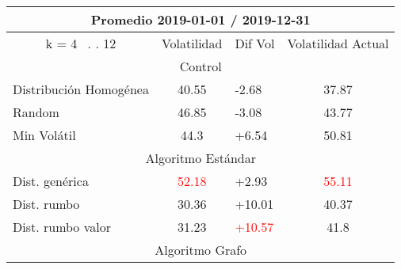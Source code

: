 \documentclass[12pt,a4paper]{article}
\begin{document}
\begin{table}[H]
\centering
\begin{tabular}{l|c|l|c|} 
\hline
\multicolumn{4}{c}{{\cellcolor[rgb]{0.635,0.647,0.788}}Promedio 2019-01-01 / 2019-12-31}                                                                                            \\ 
\hline
\multicolumn{1}{c|}{{\cellcolor[rgb]{0.635,0.647,0.788}}k = 4~ . . 12} & Volatilidad                       & Dif Vol                           & Volatilidad Actual                 \\ 
\hline
\multicolumn{4}{c}{{\cellcolor[rgb]{0.796,0.808,0.984}}Control}                                                                                                                     \\ 
\hline
\rowcolor[rgb]{0.925,0.957,1} Distribución Homogénea                   & 40.55                             & -2.68                             & 37.87                              \\
\rowcolor[rgb]{0.855,0.91,0.988} Random                                & 46.85                             & -3.08                             & 43.77                              \\
\rowcolor[rgb]{0.925,0.957,1} Min Volátil                              & 44.3                              & +6.54                             & 50.81                              \\ 
\hline
\multicolumn{4}{c}{{\cellcolor[rgb]{0.796,0.808,0.984}}Algoritmo Estándar}                                                                                                          \\ 
\hline
\rowcolor[rgb]{0.925,0.957,1} Dist. genérica                           & \textcolor{red}{52.18}            & \textcolor[rgb]{0,0.502,0}{+2.93} & \textcolor{red}{55.11}             \\
\rowcolor[rgb]{0.855,0.91,0.988} Dist. rumbo                           & 30.36                             & +10.01                            & 40.37                              \\
\rowcolor[rgb]{0.925,0.957,1} Dist. rumbo valor                        & 31.23                             & \textcolor{red}{+10.57}           & 41.8                               \\ 
\hline
\multicolumn{4}{c}{{\cellcolor[rgb]{0.796,0.808,0.984}}Algoritmo Grafo}                                                                                                             \\ 

\end{tabular}
\end{table}
\end{document}
